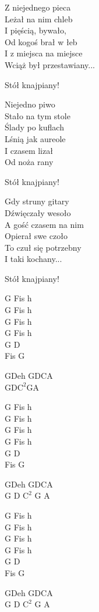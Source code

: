 \begin{textn}
    Z niejednego pieca\\
    Leżał na nim chleb\\
    I pięścią, bywało,\\
    Od kogoś brał w łeb\\
    I z miejsca na miejsce\\
    Wciąż był przestawiany...

    Stół knajpiany!

    \chordfill
    Niejedno piwo\\
    Stało na tym stole\\
    Ślady po kuflach\\
    Lśnią jak aureole\\
    I czasem lizał\\
    Od noża rany

    Stół knajpiany!

    \chordfill
    Gdy struny gitary\\
    Dźwięczały wesoło\\
    A gość czasem na nim\\
    Opierał swe czoło\\
    To czuł się potrzebny\\
    I taki kochany...

    Stół knajpiany!
\end{textn}
\begin{chordw}
    G Fis h\\
    G Fis h\\
    G Fis h\\
    G Fis h\\
    G D\\
    Fis G

    GDeh GDCA\\
    GD$\mathrm{C^{2}}$GA

    G Fis h\\
    G Fis h\\
    G Fis h\\
    G Fis h\\
    G D\\
    Fis G

    GDeh GDCA\\
    G D $\mathrm{C^2}$ G A

    G Fis h\\
    G Fis h\\
    G Fis h\\
    G Fis h\\
    G D\\
    Fis G

    GDeh GDCA\\
    G D $\mathrm{C^2}$ G A
\end{chordw}
